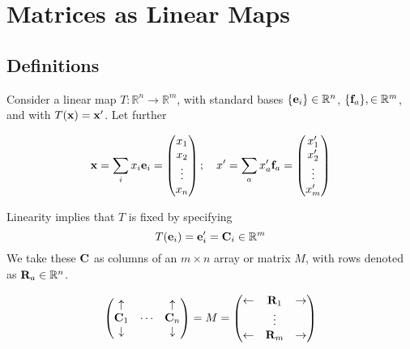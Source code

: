 \documentclass{article}
\begin{document}
\section{Matrices as Linear Maps}
\subsection{Definitions}
Consider a linear map $T: \mathbb R^n \to \mathbb R^m$, with standard bases $\{ \vb e_i \} \in \mathbb R^n$, $\{ \vb f_a \}, \in \mathbb R^m$, and with $T(\vb x) = \vb x'$.
Let further

\[ \vb x = \sum_i x_i \vb e_i = \begin{pmatrix}
		x_1 \\ x_2 \\ \vdots \\ x_n
	\end{pmatrix};\quad x' = \sum_a x_a' \vb f_a = \begin{pmatrix}
		x_1' \\ x_2' \\ \vdots \\ x_m'
	\end{pmatrix} \]

Linearity implies that $T$ is fixed by specifying
\[ T(\vb e_i) = \vb e_i' = \vb C_i \in \mathbb R^m \]
We take these $\vb C$ as columns of an $m \times n$ array or matrix $M$, with rows denoted as $\vb R_a \in \mathbb R^n$.

\[ \begin{pmatrix}
		\uparrow   &        & \uparrow   \\
		\vb C_1    & \cdots & \vb C_n    \\
		\downarrow &        & \downarrow
	\end{pmatrix} = M = \begin{pmatrix}
		\leftarrow & \vb R_1 & \rightarrow \\
		           & \vdots  &             \\
		\leftarrow & \vb R_m & \rightarrow
	\end{pmatrix} \]
\end{document}
